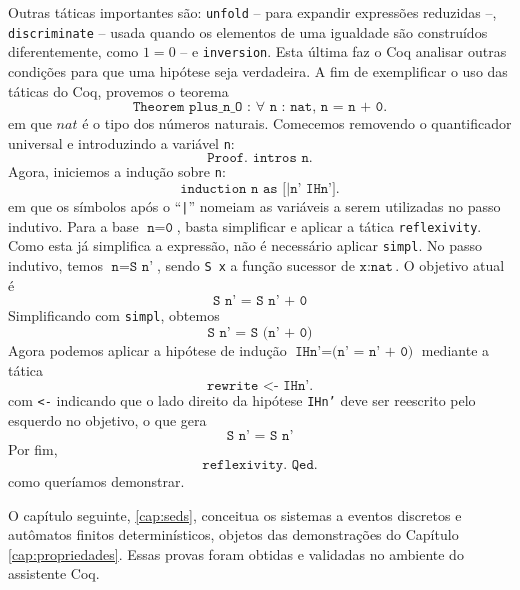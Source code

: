 Outras táticas importantes são: \texttt{unfold} -- para expandir expressões reduzidas --, \texttt{discriminate} -- usada quando os elementos de uma igualdade são construídos diferentemente, como $1 = 0$ -- e \texttt{inversion}. Esta última faz o Coq analisar outras condições para que uma hipótese seja verdadeira. A fim de exemplificar o uso das táticas do Coq, provemos o teorema $$\texttt{Theorem plus\_n\_O : $\forall$ n : nat, n = n + 0.}$$ em que $nat$ é o tipo dos números naturais. Comecemos removendo o quantificador universal e introduzindo a variável \texttt{n}: $$\texttt{Proof. intros n.}$$ Agora, iniciemos a indução sobre \texttt{n}: $$\texttt{induction n as [|n' IHn'].}$$ em que os símbolos após o ``\texttt{|}'' nomeiam as variáveis a serem utilizadas no passo indutivo. Para a base $\texttt{n} = \texttt{0}$, basta simplificar e aplicar a tática \texttt{reflexivity}. Como esta já simplifica a expressão, não é necessário aplicar \texttt{simpl}. No passo indutivo, temos $\texttt{n} = \texttt{S n'}$, sendo \texttt{S x} a função sucessor de $\texttt{x} : \texttt{nat}$. O objetivo atual é $$\texttt{S n' = S n' + 0}$$ Simplificando com \texttt{simpl}, obtemos $$\texttt{S n' = S (n' + 0)}$$ Agora podemos aplicar a hipótese de indução $\texttt{IHn'} = \texttt{(n' = n' + 0)}$ mediante a tática $$\texttt{rewrite <- IHn'.}$$ com \texttt{<-} indicando que o lado direito da hipótese \texttt{IHn'} deve ser reescrito pelo esquerdo no objetivo, o que gera $$\texttt{S n' = S n'}$$ Por fim, $$\texttt{reflexivity. Qed.}$$ como queríamos demonstrar.

O capítulo seguinte, \ref{cap:seds}, conceitua os sistemas a eventos discretos e autômatos finitos determinísticos, objetos das demonstrações do Capítulo \ref{cap:propriedades}. Essas provas foram obtidas e validadas no ambiente do assistente Coq.